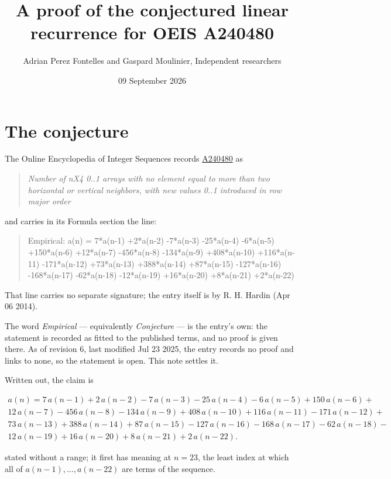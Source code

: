 \documentclass[11pt]{article}
\title{A proof of the conjectured linear recurrence for OEIS A240480}
\author{Adrian Perez Fontelles and Gaspard Moulinier, Independent researchers}
\date{09 September 2026}
\theoremstyle{definition}
\begin{document}
\maketitle
\section{The conjecture}

The Online Encyclopedia of Integer Sequences records \href{https://oeis.org/A240480}{A240480} as

\begin{quote}\itshape Number of nX4 0..1 arrays with no element equal to more than two horizontal or vertical neighbors, with new values 0..1 introduced in row major order\end{quote}

and carries in its Formula section the line:

\begin{quote}\ttfamily Empirical: a(n) = 7*a(n-1) +2*a(n-2) -7*a(n-3) -25*a(n-4) -6*a(n-5) +150*a(n-6) +12*a(n-7) -456*a(n-8) -134*a(n-9) +408*a(n-10) +116*a(n-11) -171*a(n-12) +73*a(n-13) +388*a(n-14) +87*a(n-15) -127*a(n-16) -168*a(n-17) -62*a(n-18) -12*a(n-19) +16*a(n-20) +8*a(n-21) +2*a(n-22)\end{quote}

That line carries no separate signature; the entry itself is by R. H. Hardin (Apr 06 2014).

The word {\itshape Empirical} --- equivalently {\itshape Conjecture} --- is the entry's own: the statement is recorded as fitted to the published terms, and no proof is given there. As of revision 6, last modified Jul 23 2025, the entry records no proof and links to none, so the statement is open. This note settles it.

Written out, the claim is

\begin{multline*} a(n) = 7\,a(n-1) + 2\,a(n-2) - 7\,a(n-3) - 25\,a(n-4) - 6\,a(n-5) + 150\,a(n-6) + \\ 12\,a(n-7) - 456\,a(n-8) - 134\,a(n-9) + 408\,a(n-10) + 116\,a(n-11) - 171\,a(n-12) + \\ 73\,a(n-13) + 388\,a(n-14) + 87\,a(n-15) - 127\,a(n-16) - 168\,a(n-17) - 62\,a(n-18) - \\ 12\,a(n-19) + 16\,a(n-20) + 8\,a(n-21) + 2\,a(n-22). \end{multline*}

stated without a range; it first has meaning at $n = 23$, the least index at which all of $a(n-1),\dots,a(n-22)$ are terms of the sequence.
\end{document}
